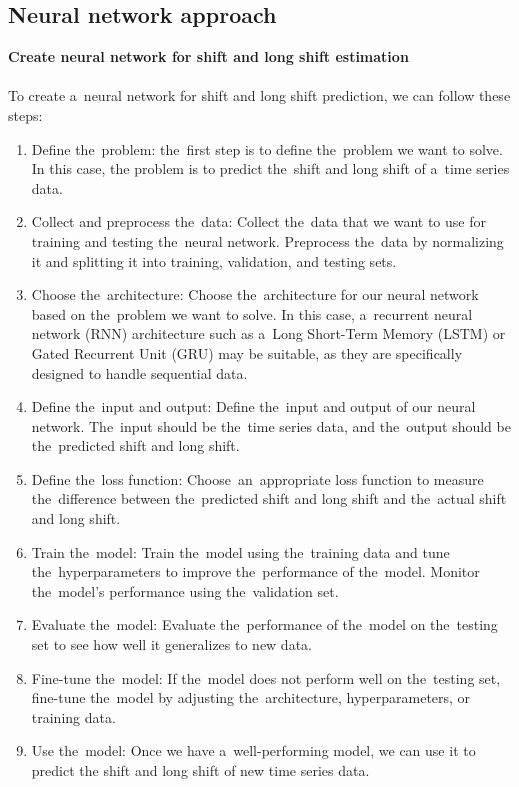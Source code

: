        \subsection{Neural network approach} \label{subsec:neural}
        \textbf{Create neural network for shift and long shift estimation}\\
        \\
        To create a~neural network for shift and long shift prediction, we can follow these steps:
        \begin{enumerate}
            \item Define the~problem: the~first step is to define the~problem we want to solve. In this case, the
            problem is to predict the~shift and long shift of a~time series data.
            \item Collect and preprocess the~data: Collect the~data that we want to use for training and
            testing the~neural network. Preprocess the~data by normalizing it and splitting it into training,
            validation, and testing sets.
            \item Choose the~architecture: Choose the~architecture for our neural network based on the~problem
            we want to solve. In this case, a~recurrent neural network (RNN) architecture such as a~Long Short-Term
            Memory (LSTM) or Gated Recurrent Unit (GRU) may be suitable, as they are specifically designed to handle
            sequential data.
            \item Define the~input and output: Define the~input and output of our neural network. The~input should
            be the~time series data, and the~output should be the~predicted shift and long shift.
            \item Define the~loss function: Choose~an~appropriate loss function to measure the~difference
            between the~predicted shift and long shift and the~actual shift and long shift.
            \item Train the~model: Train the~model using the~training data and tune the~hyperparameters to
            improve the~performance of the~model. Monitor the~model's performance using the~validation set.
            \item Evaluate the~model: Evaluate the~performance of the~model on the~testing set to see how well
            it generalizes to new data.
            \item Fine-tune the~model: If the~model does not perform well on the~testing set, fine-tune the~model by
            adjusting the~architecture, hyperparameters, or training data.
            \item Use the~model: Once we have a~well-performing model, we can use it to predict the
            shift and long shift of new time series data.
        \end{enumerate}
